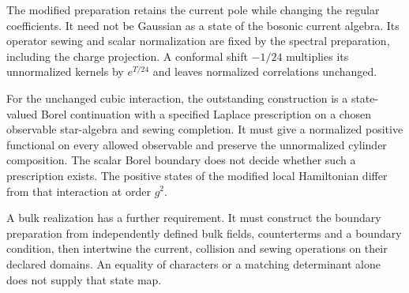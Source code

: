 The modified preparation retains the current pole while changing
the regular coefficients. It need not be Gaussian as a state of
the bosonic current algebra. Its operator sewing and scalar
normalization are fixed by the spectral preparation, including
the charge projection. A conformal shift \(-1/24\) multiplies
its unnormalized kernels by \(e^{T/24}\) and leaves normalized
correlations unchanged.

For the unchanged cubic interaction, the outstanding construction
is a state-valued Borel continuation with a specified Laplace
prescription on a chosen observable star-algebra and sewing
completion. It must give a normalized positive functional on every
allowed observable and preserve the unnormalized cylinder
composition. The scalar Borel boundary does not decide whether
such a prescription exists. The positive states of the modified
local Hamiltonian differ from that interaction at order \(g^2\).

A bulk realization has a further requirement. It must construct
the boundary preparation from independently defined bulk fields,
counterterms and a boundary condition, then intertwine the current,
collision and sewing operations on their declared domains.
An equality of characters or a matching determinant alone does
not supply that state map.
